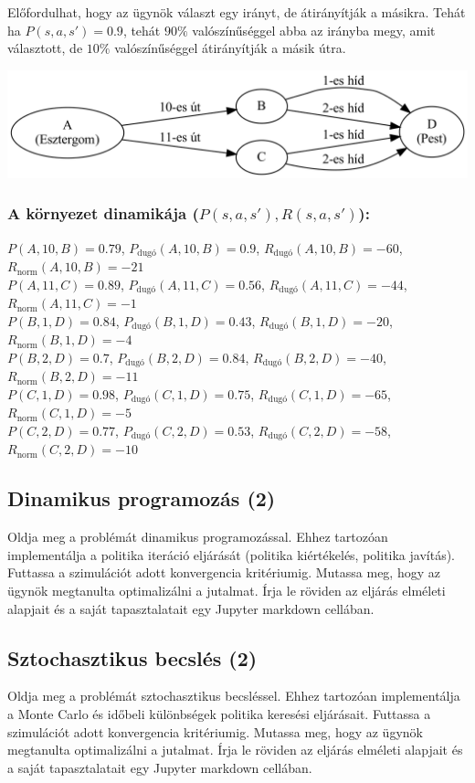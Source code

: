 \documentclass[english]{article}
\begin{document}
Előfordulhat, hogy az ügynök választ egy irányt, de átirányítják a másikra. Tehát ha $P(s,a,s') = 0.9$, tehát $90\%$ valószínűséggel abba az irányba megy, amit választott, de $10\%$ valószínűséggel átirányítják a másik útra.

\begin{center}
\includegraphics[width=\textwidth, keepaspectratio]{graphs/1_duna.png}
\end{center}

\subsubsection*{A környezet dinamikája ($P(s,a,s'), R(s,a,s')$):} 
$P(A,10,B)=0.79$, $P_\text{dugó}(A,10,B)=0.9$, $R_\text{dugó}(A,10,B)=-60$, $R_\text{norm}(A,10,B)=-21$\\
$P(A,11,C)=0.89$, $P_\text{dugó}(A,11,C)=0.56$, $R_\text{dugó}(A,11,C)=-44$, $R_\text{norm}(A,11,C)=-1$\\
$P(B,1,D)=0.84$, $P_\text{dugó}(B,1,D)=0.43$, $R_\text{dugó}(B,1,D)=-20$, $R_\text{norm}(B,1,D)=-4$\\
$P(B,2,D)=0.7$, $P_\text{dugó}(B,2,D)=0.84$, $R_\text{dugó}(B,2,D)=-40$, $R_\text{norm}(B,2,D)=-11$\\
$P(C,1,D)=0.98$, $P_\text{dugó}(C,1,D)=0.75$, $R_\text{dugó}(C,1,D)=-65$, $R_\text{norm}(C,1,D)=-5$\\
$P(C,2,D)=0.77$, $P_\text{dugó}(C,2,D)=0.53$, $R_\text{dugó}(C,2,D)=-58$, $R_\text{norm}(C,2,D)=-10$\\

\subsection{Dinamikus programozás (2)}
Oldja meg a problémát dinamikus programozással. Ehhez tartozóan implementálja a politika iteráció eljárását (politika kiértékelés, politika javítás). Futtassa a szimulációt adott konvergencia kritériumig. Mutassa meg, hogy az ügynök megtanulta optimalizálni a jutalmat. Írja le röviden az eljárás elméleti alapjait és a saját tapasztalatait egy Jupyter markdown cellában.

\subsection{Sztochasztikus becslés (2)}
Oldja meg a problémát sztochasztikus becsléssel. Ehhez tartozóan implementálja a Monte Carlo és időbeli különbségek politika keresési eljárásait. Futtassa a szimulációt adott konvergencia kritériumig. Mutassa meg, hogy az ügynök megtanulta optimalizálni a jutalmat. Írja le röviden az eljárás elméleti alapjait és a saját tapasztalatait egy Jupyter markdown cellában.
\end{document}

